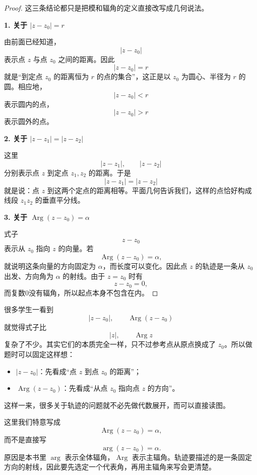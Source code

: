 \begin{proof}
这三条结论都只是把模和辐角的定义直接改写成几何说法。

\noindent\textbf{1. 关于 $|z-z_0|=r$}

由前面已经知道，
\[
|z-z_0|
\]
表示点 $z$ 与点 $z_0$ 之间的距离。因此
\[
|z-z_0|=r
\]
就是``到定点 $z_0$ 的距离恒为 $r$ 的点的集合''，这正是以 $z_0$ 为圆心、半径为 $r$ 的圆。相应地，
\[
|z-z_0|<r
\]
表示圆内的点，
\[
|z-z_0|>r
\]
表示圆外的点。

\noindent\textbf{2. 关于 $|z-z_1|=|z-z_2|$}

这里
\[
|z-z_1|,\qquad |z-z_2|
\]
分别表示点 $z$ 到定点 $z_1,z_2$ 的距离。于是
\[
|z-z_1|=|z-z_2|
\]
就是说：点 $z$ 到这两个定点的距离相等。平面几何告诉我们，这样的点恰好构成线段 $z_1z_2$ 的垂直平分线。

\noindent\textbf{3. 关于 $\operatorname{Arg}(z-z_0)=\alpha$}

式子
\[
z-z_0
\]
表示从 $z_0$ 指向 $z$ 的向量。若
\[
\operatorname{Arg}(z-z_0)=\alpha,
\]
就说明这条向量的方向固定为 $\alpha$，而长度可以变化。因此点 $z$ 的轨迹是一条从 $z_0$ 出发、方向角为 $\alpha$ 的射线。由于 $z=z_0$ 时有
\[
z-z_0=0,
\]
而复数0没有辐角，所以起点本身不包含在内。
\end{proof}



\begin{tishi}[看到 $z-z_0$ 时，先把参考点平移到 $z_0$]
很多学生一看到
\[
|z-z_0|,\qquad \operatorname{Arg}(z-z_0)
\]
就觉得式子比
\[
|z|,\qquad \operatorname{Arg}z
\]
复杂了不少。其实它们的本质完全一样，只不过参考点从原点换成了 $z_0$。所以做题时可以固定这样想：
\begin{itemize}
    \item $|z-z_0|$：先看成``点 $z$ 到点 $z_0$ 的距离''；
    \item $\operatorname{Arg}(z-z_0)$：先看成``从点 $z_0$ 指向点 $z$ 的方向''。
\end{itemize}
这样一来，很多关于轨迹的问题就不必先做代数展开，而可以直接读图。
\end{tishi}

\begin{zhu}{}{}
这里我们特意写成
\[
\operatorname{Arg}(z-z_0)=\alpha,
\]
而不是直接写
\[
\arg(z-z_0)=\alpha.
\]
原因是本书里 $\arg$ 表示全体辐角，$\operatorname{Arg}$ 表示主辐角。轨迹要描述的是一条固定方向的射线，因此要先选定一个代表角，再用主辐角来写会更清楚。
\end{zhu}


